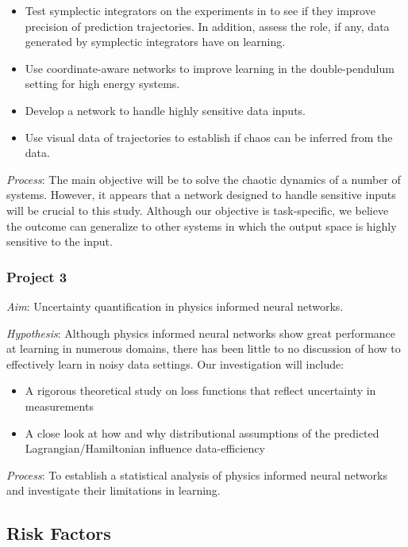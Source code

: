 \documentclass{article}
\begin{document}
\begin{itemize}
\item{Test symplectic integrators on the experiments in \cite{choudhary_physics_2019} to see if they improve precision of prediction trajectories. In addition, assess the role, if any, data generated by symplectic integrators have on learning.}
\item{Use coordinate-aware networks \cite{zhong_unsupervised_2020} to improve learning in the double-pendulum setting for high energy systems.}
\item{Develop a network to handle highly sensitive data inputs.}
\item{Use visual data of trajectories to establish if chaos can be inferred from the data.}

\end{itemize}

\textit{Process}: The main objective will be to solve the chaotic dynamics of a number of systems. However, it appears that a network designed to handle sensitive inputs will be crucial to this study. Although our objective is task-specific, we believe the outcome can generalize to other systems in which the output space is highly sensitive to the input. 

\subsubsection*{Project 3}

\textit{Aim}: Uncertainty quantification in physics informed neural networks.

\textit{Hypothesis}: Although physics informed neural networks show great performance at learning in numerous domains, there has been little to no discussion of how to effectively learn in noisy data settings. Our investigation will include:

\begin{itemize}
\item{A rigorous theoretical study on loss functions that reflect uncertainty in measurements}
\item{A close look at how and why distributional assumptions of the predicted Lagrangian/Hamiltonian influence data-efficiency}
\end{itemize}

\textit{Process}: To establish a statistical analysis of physics informed neural networks and investigate their limitations in learning. 


\subsection*{Risk Factors} 
\end{document}
